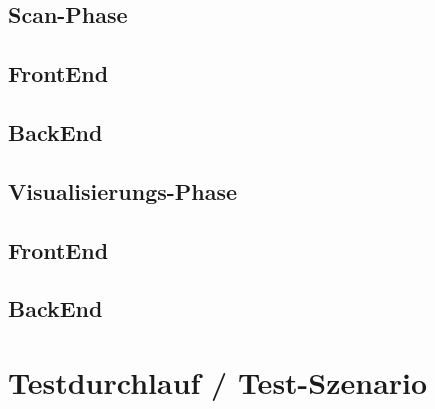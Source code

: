 \subsection{Scan-Phase} %
\subsection*{FrontEnd}
\subsection*{BackEnd}

\subsection{Visualisierungs-Phase} 
\subsection*{FrontEnd}
\subsection*{BackEnd}

\section{Testdurchlauf / Test-Szenario}
\label{chap:testdurchlauf}